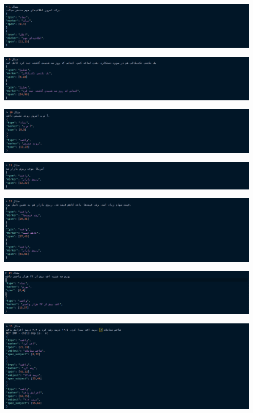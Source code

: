 \documentclass[a4paper,12pt]{article}
\begin{document}
\begin{center}
	\includegraphics[scale=0.5, trim ={0 0 17cm 0}, clip]{images/1.png}

	\includegraphics[scale=0.5, trim ={0 0 17cm 0}, clip]{images/9.png}

	\includegraphics[scale=0.5, trim ={0 0 17cm 0}, clip]{images/10.png}

	\includegraphics[scale=0.5, trim ={0 0 17cm 0}, clip]{images/11.png}

	\includegraphics[scale=0.5, trim ={0 0 17cm 0}, clip]{images/13.png}

	\includegraphics[scale=0.5, trim ={0 0 17cm 0}, clip]{images/14.png}

	\includegraphics[scale=0.5, trim ={0 0 17cm 0}, clip]{images/15.png}
\end{center}
\end{document}
